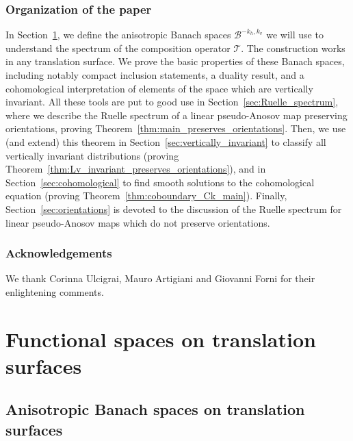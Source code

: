 \documentclass[JEP,XML,SOM,Unicode]{cedram}
\newcommand{\boB}{\mathcal{B}}
\newcommand{\boT}{\mathcal{T}}
\theoremstyle{definition}
\numberwithin{equation}{section}
\begin{document}
\subsubsection*{Organization of the paper}
In Section~\ref{sec:def_boB}, we define the anisotropic Banach spaces
$\boB^{-k_h, k_v}$ we will use to understand the spectrum of the composition
operator $\boT$. The construction works in any translation surface. We prove
the basic properties of these Banach spaces, including notably compact
inclusion statements, a duality result, and a cohomological interpretation of
elements of the space which are vertically invariant. All these tools are put
to good use in Section~\ref{sec:Ruelle_spectrum}, where we describe the
Ruelle spectrum of a linear pseudo-Anosov map preserving orientations,
proving Theorem~\ref{thm:main_preserves_orientations}. Then, we use (and
extend) this theorem in Section~\ref{sec:vertically_invariant} to classify
all vertically invariant distributions (proving
Theorem~\ref{thm:Lv_invariant_preserves_orientations}), and in
Section~\ref{sec:cohomological} to find smooth solutions to the cohomological
equation (proving Theorem~\ref{thm:coboundary_Ck_main}). Finally,
Section~\ref{sec:orientations} is devoted to the discussion of the Ruelle
spectrum for linear pseudo-Anosov maps which do not preserve orientations.

\subsubsection*{Acknowledgements}
We thank Corinna Ulcigrai, Mauro Artigiani and Giovanni Forni for their enlightening comments.

\section{Functional spaces on translation surfaces}
\label{sec:def_boB}

\subsection{Anisotropic Banach spaces on translation surfaces}

\label{subsec:Bkhkv}
\end{document}
